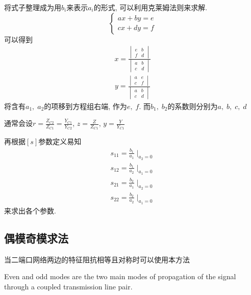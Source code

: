 \documentclass[a4paper]{report}
\begin{document}
将式子整理成为用$b_i$来表示$a_i$的形式, 可以利用克莱姆法则来求解. 
\begin{equation}
  \begin{cases}
    ax+by=e
    \\ cx+dy=f
  \end{cases}
\end{equation}
可以得到
\begin{gather}
  x=\frac{\begin{vmatrix}
    e&b
    \\ f&d
  \end{vmatrix}}{\begin{vmatrix}
    a&b
    \\ c&d
  \end{vmatrix}}
\end{gather}
\begin{gather}
  y=\frac{\begin{vmatrix}
    a&e
    \\ c&f
  \end{vmatrix}}{\begin{vmatrix}
    a&b
    \\ c&d
  \end{vmatrix}}
\end{gather}
将含有$a_1,\; a_2$的项移到方程组右端, 作为$e,\; f$. 而$b_1,\; b_2$的系数则分别为$a,\; b, \; c, \; d$

通常会设$r=\frac{Z_{C2}}{Z_{C1}}=\frac{Y_{C1}}{Y_{C2}}$, $z=\frac{Z}{Z_{C1}}$, $y=\frac{Y}{Y_{C1}}$

再根据$[s]$参数定义易知
\begin{align*}
  s_{11}=\frac{b_1}{a_1}\mid_{a_2=0}
  \\  s_{12}=\frac{b_1}{a_2}\mid_{a_1=0}
  \\  s_{21}=\frac{b_2}{a_1}\mid_{a_2=0}
  \\  s_{22}=\frac{b_2}{a_2}\mid_{a_1=0}
\end{align*}
来求出各个参数. 
\subsection{偶模奇模求法}
当二端口网络两边的特征阻抗相等且对称时可以使用本方法

Even and odd modes are the two main modes of propagation of the signal through a coupled transmission line pair. 
\end{document}
